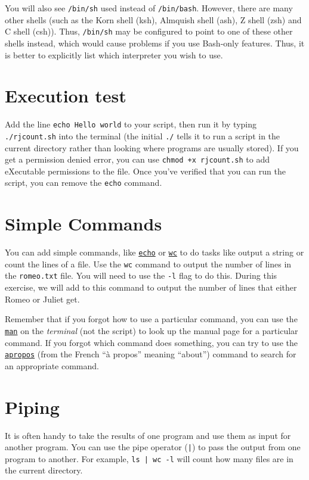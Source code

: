 \documentclass[12pt]{article}
\newcommand{\code}[1]{\texttt{#1}}
\newcommand{\filename}{\code{rjcount.sh}\xspace}
\begin{document}
You will also see \code{/bin/sh} used instead of \code{/bin/bash}.
However, there are many other shells (such as the Korn shell (ksh), Almquish shell (ash), Z shell (zsh) and C shell (csh)).
Thus, \code{/bin/sh} may be configured to point to one of these other shells instead, which would cause problems if you use Bash-only features.
Thus, it is better to explicitly list which interpreter you wish to use.

\section*{Execution test}
Add the line \code{echo Hello world} to your script, then run it by typing \code{./\filename} into the terminal 
(the initial \code{./} tells it to run a script in the current directory rather than looking where programs are usually stored).
If you get a permission denied error, you can use \code{chmod +x \filename} to add eXecutable permissions to the file.
Once you've verified that you can run the script, you can remove the \code{echo} command.

\section*{Simple Commands}
You can add simple commands, like \href{https://en.wikipedia.org/wiki/Echo_(command)}{\code{echo}} or \href{https://en.wikipedia.org/wiki/Wc_(Unix)}{\code{wc}} to do tasks like output a string or count the lines of a file.
Use the \code{wc} command to output the number of lines in the \code{romeo.txt} file.
You will need to use the \code{-l} flag to do this.
During this exercise, we will add to this command to output the number of lines that either Romeo or Juliet get.

Remember that if you forgot how to use a particular command, you can use the \href{https://en.wikipedia.org/wiki/Man_page}{\code{man}} on the \emph{terminal} (not the script) to look up the manual page for a particular command.
If you forgot which command does something, you can try to use the \href{https://en.wikipedia.org/wiki/Apropos_(Unix)}{\code{apropos}} (from the French ``\`{a} propos'' meaning ``about'') command to search for an appropriate command.

\section*{Piping}
It is often handy to take the results of one program and use them as input for another program.
You can use the pipe operator (\code{|}) to pass the output from one program to another.
For example, \code{ls | wc -l} will count how many files are in the current directory.
\end{document}
